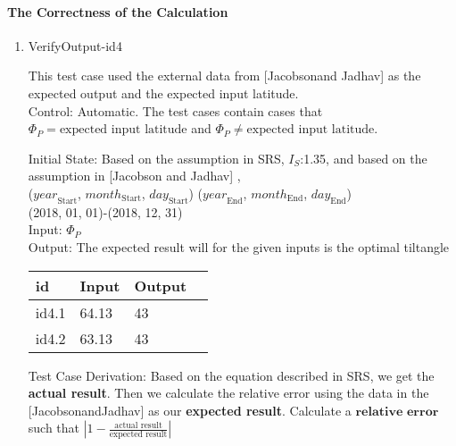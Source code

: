 \documentclass[12pt, titlepage]{article}
\begin{document}
\paragraph{The Correctness of the Calculation}\label{tP_CC}
\begin{enumerate}


\item{VerifyOutput-id4\\} 

This test case used the external data from [Jacobsonand
Jadhav] \cite{JacobsonandJadhav} as the expected output and the expected
input latitude.\\ 

Control: Automatic. The test cases contain cases that $\Phi_P
= \text{expected input latitude}$ and $\Phi_P \ne \text{expected input
latitude}$. 

Initial State: Based on the assumption in SRS\cite{YS2019}, $I_{S}$:1.35, and
based on the assumption in [Jacobson and Jadhav] \cite{JacobsonandJadhav},\\
($\mathit{year}_\text{Start}$, $\mathit{month}_\text{Start}$, $\mathit{day}_\text{Start}$)  ($\mathit{year}_\text{End}$, $\mathit{month}_\text{End}$, $\mathit{day}_\text{End}$)\\ 
(2018, 01, 01)-(2018, 12, 31)
\\

Input: $\Phi_P$\\

Output: The expected result will for the given inputs is the optimal tiltangle


\noindent \begin{tabular}{l l l l} 
    \toprule		
    \textbf{id} & \textbf{Input} & \textbf{Output}\\ 
	\midrule
   id4.1 &  64.13 & 43\\
   id4.2 &  63.13 & 43\\
    \bottomrule
  \end{tabular}


Test Case Derivation: Based on the equation described in SRS\cite{YS2019}, we
get the \textbf{actual result}. Then we calculate the relative error using the
data in the
 [JacobsonandJadhav]\cite{JacobsonandJadhav} as our \textbf{expected result}. 
Calculate a $\textbf{relative error}$ such that $| 1 - \frac{\text{actual result}}{ \text{expected result}} |$ 


\end{enumerate}
\end{document}
